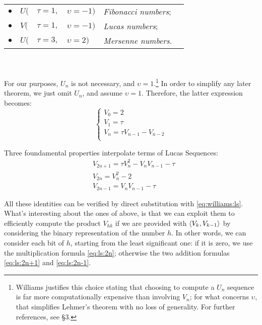 \begin{tabular}{c l@{\hskip 0pt} l@{\hskip 1pt} l l l}
  $\bullet$ & $U($ & $\tau=1,$ & $\upsilon=-1)$ & \emph{Fibonacci numbers}; \\
  $\bullet$ & $V($ & $\tau=1,$ & $\upsilon=-1)$ & \emph{Lucas numbers}; \\
  $\bullet$ & $U($ & $\tau=3,$ & $\upsilon=2)$ & \emph{Mersenne numbers}.\\
\end{tabular}
\\
\\
For our purposes, $U_n$ is not necessary, and $\upsilon=1$.\footnote{
  Williams justifies this choice stating that choosing to compute a $U_n$ sequence
  is far more computationally expensive than involving $V_n$; for what
  concerns $\upsilon$, that simplifies Lehmer's theorem with no loss of
  generality. For further references,
  see \cite{Williams:p+1} \S 3.}
In order to simplify any later theorem, we just omit $U_n$, and assume $\upsilon
= 1$.
Therefore, the latter expression becomes:
\begin{equation}
  \label{eq:williams:ls}
  \begin{cases}
    V_0 = 2 \\
    V_1 = \tau \\
    V_n = \tau V_{n-1} - V_{n-2} \\
  \end{cases}
\end{equation}

Three foundamental properties interpolate terms of Lucas Sequences:
\begin{align}
  & V_{2n+1} = \tau V_n^2 - V_n V_{n-1} - \tau \label{eq:ls:2n+1} \\
  & V_{2n} = V_n^2 - 2 \label{eq:ls:2n} \\
  & V_{2n-1} = V_nV_{n-1} - \tau \label{eq:ls:2n-1}
\end{align}

All these identities can be verified by direct substitution with
\ref{eq:williams:ls}. What's interesting about the ones of above, is that we can
exploit them to efficiently compute the product $V_{hk}$ if we are provided with
$\langle V_k, V_{k-1}\rangle$ by considering the binary representation of the number
$h$. In other words, we can consider each bit of $h$, starting from the least
significant one: if it is zero, we use the multiplication formula
\ref{eq:ls:2n}; otherwise the two addition formulas \ref{eq:ls:2n+1} and
\ref{eq:ls:2n-1}.

